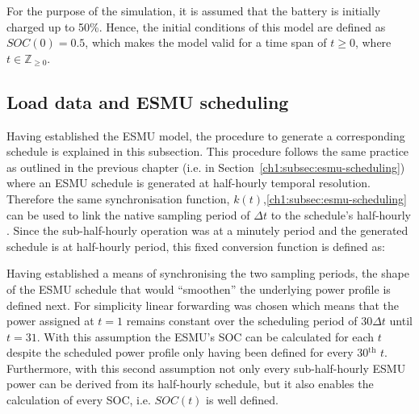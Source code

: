 For the purpose of the simulation, it is assumed that the battery is initially charged up to 50\%.
Hence, the initial conditions of this model are defined as $SOC(0) = 0.5$, which makes the model valid for a time span of $t \geq 0$, where $t \in \mathbb{Z}_{\geq0}$.

\subsection{Load data and ESMU scheduling}
\label{ch2:subsec:load-data-and-esmu-scheduling}


Having established the ESMU model, the procedure to generate a corresponding schedule is explained in this subsection.
This procedure follows the same practice as outlined in the previous chapter (i.e. in Section~\ref{ch1:subsec:esmu-scheduling}) where an ESMU schedule is generated at half-hourly temporal resolution.
Therefore the same synchronisation function, $k(t)$,\ref{ch1:subsec:esmu-scheduling} can be used to link the native sampling period of $\Delta t$ to the schedule's half-hourly .
Since the sub-half-hourly operation was at a minutely period and the generated schedule is at half-hourly period, this fixed conversion function is defined as:



Having established a means of synchronising the two sampling periods, the shape of the ESMU schedule that would ``smoothen'' the underlying power profile is defined next.
For simplicity linear forwarding was chosen which means that the power assigned at  $t=1$ remains constant over the scheduling period of $30\Delta t$ until $t=31$.
With this assumption the ESMU's SOC can be calculated for each $t$ despite the scheduled power profile only having been defined for every 30$^\text{th}$ $t$.
Furthermore, with this second assumption not only every sub-half-hourly ESMU power can be derived from its half-hourly schedule, but it also enables the calculation of every SOC, i.e. $SOC(t)$ is well defined.


